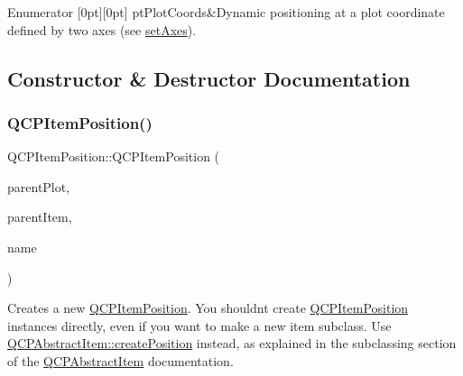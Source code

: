 \begin{DoxyEnumFields}{Enumerator}
[0pt][0pt]{}\mbox{\label{class_q_c_p_item_position_aad9936c22bf43e3d358552f6e86dbdc8ad5ffb8dc99ad73263f7010c77342294c}} 
pt\+Plot\+Coords&Dynamic positioning at a plot coordinate defined by two axes (see \hyperlink{class_q_c_p_item_position_a2185f45c75ac8cb9be89daeaaad50e37}{set\+Axes}). \\
\hline

\end{DoxyEnumFields}


\subsection{Constructor \& Destructor Documentation}
\mbox{\label{class_q_c_p_item_position_a6519a552bd9766354644ec24d1f26622}} 
\subsubsection{\texorpdfstring{Q\+C\+P\+Item\+Position()}{QCPItemPosition()}}
{\footnotesize\ttfamily Q\+C\+P\+Item\+Position\+::\+Q\+C\+P\+Item\+Position (\begin{DoxyParamCaption}\item[{\hyperlink{class_q_custom_plot}{Q\+Custom\+Plot} $\ast$}]{parent\+Plot,  }\item[{\hyperlink{class_q_c_p_abstract_item}{Q\+C\+P\+Abstract\+Item} $\ast$}]{parent\+Item,  }\item[{const Q\+String \&}]{name }\end{DoxyParamCaption})}

Creates a new \hyperlink{class_q_c_p_item_position}{Q\+C\+P\+Item\+Position}. You shouldn\textquotesingle{}t create \hyperlink{class_q_c_p_item_position}{Q\+C\+P\+Item\+Position} instances directly, even if you want to make a new item subclass. Use \hyperlink{class_q_c_p_abstract_item_a75036d39c4d4e2e1a7dd145fff915d32}{Q\+C\+P\+Abstract\+Item\+::create\+Position} instead, as explained in the subclassing section of the \hyperlink{class_q_c_p_abstract_item}{Q\+C\+P\+Abstract\+Item} documentation. \mbox{\label{class_q_c_p_item_position_ad8a289016f7a62332f9c865c39ab2047}} 
